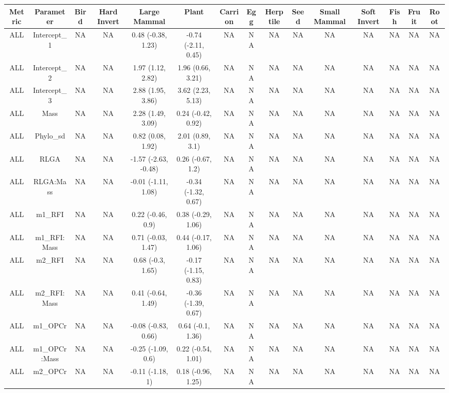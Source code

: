 \begingroup\fontsize{5}{7}\selectfont

\begin{longtable}[t]{c|c|c|c|c|c|c|c|c|c|c|c|c|c|c}
\hline
Metric & Parameter & Bird & Hard Invert & Large Mammal & Plant & Carrion & Egg & Herptile & Seed & Small Mammal & Soft Invert & Fish & Fruit & Root\\
\hline
ALL & Intercept_1 & NA & NA & 0.48 (-0.38, 1.23) & -0.74 (-2.11, 0.45) & NA & NA & NA & NA & NA & NA & NA & NA & NA\\
\hline
ALL & Intercept_2 & NA & NA & 1.97 (1.12, 2.82) & 1.96 (0.66, 3.21) & NA & NA & NA & NA & NA & NA & NA & NA & NA\\
\hline
ALL & Intercept_3 & NA & NA & 2.88 (1.95, 3.86) & 3.62 (2.23, 5.13) & NA & NA & NA & NA & NA & NA & NA & NA & NA\\
\hline
ALL & Mass & NA & NA & 2.28 (1.49, 3.09) & 0.24 (-0.42, 0.92) & NA & NA & NA & NA & NA & NA & NA & NA & NA\\
\hline
ALL & Phylo_sd & NA & NA & 0.82 (0.08, 1.92) & 2.01 (0.89, 3.1) & NA & NA & NA & NA & NA & NA & NA & NA & NA\\
\hline
ALL & RLGA & NA & NA & -1.57 (-2.63, -0.48) & 0.26 (-0.67, 1.2) & NA & NA & NA & NA & NA & NA & NA & NA & NA\\
\hline
ALL & RLGA:Mass & NA & NA & -0.01 (-1.11, 1.08) & -0.34 (-1.32, 0.67) & NA & NA & NA & NA & NA & NA & NA & NA & NA\\
\hline
ALL & m1_RFI & NA & NA & 0.22 (-0.46, 0.9) & 0.38 (-0.29, 1.06) & NA & NA & NA & NA & NA & NA & NA & NA & NA\\
\hline
ALL & m1_RFI:Mass & NA & NA & 0.71 (-0.03, 1.47) & 0.44 (-0.17, 1.06) & NA & NA & NA & NA & NA & NA & NA & NA & NA\\
\hline
ALL & m2_RFI & NA & NA & 0.68 (-0.3, 1.65) & -0.17 (-1.15, 0.83) & NA & NA & NA & NA & NA & NA & NA & NA & NA\\
\hline
ALL & m2_RFI:Mass & NA & NA & 0.41 (-0.64, 1.49) & -0.36 (-1.39, 0.67) & NA & NA & NA & NA & NA & NA & NA & NA & NA\\
\hline
ALL & m1_OPCr & NA & NA & -0.08 (-0.83, 0.66) & 0.64 (-0.1, 1.36) & NA & NA & NA & NA & NA & NA & NA & NA & NA\\
\hline
ALL & m1_OPCr:Mass & NA & NA & -0.25 (-1.09, 0.6) & 0.22 (-0.54, 1.01) & NA & NA & NA & NA & NA & NA & NA & NA & NA\\
\hline
ALL & m2_OPCr & NA & NA & -0.11 (-1.18, 1) & 0.18 (-0.96, 1.25) & NA & NA & NA & NA & NA & NA & NA & NA & NA\\

\end{longtable}
